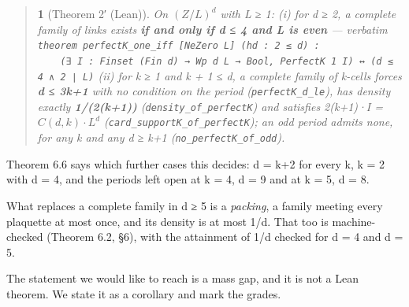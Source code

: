 \documentclass[11pt,a4paper]{article}
\theoremstyle{named}
\newtheorem*{namedthm}{}
\begin{document}
\begin{quote}
\begin{namedthm}[Theorem 2′ (Lean)]
On $(Z/L)^d$ with L ≥ 1: (i) for d ≥ 2, a complete family of links exists \textbf{if and only if d ≤ 4 and L is even} — verbatim\\
\texttt{theorem\ \allowbreak{}perfectK\_\allowbreak{}one\_\allowbreak{}iff\ \allowbreak{}[NeZero\ \allowbreak{}L]\ \allowbreak{}(hd\ \allowbreak{}:\ \allowbreak{}2\ \allowbreak{}≤\ \allowbreak{}d)\ \allowbreak{}:}\\
\texttt{\ \allowbreak{}\ \allowbreak{}\ \allowbreak{}\ \allowbreak{}(∃\ \allowbreak{}I\ \allowbreak{}:\ \allowbreak{}Finset\ \allowbreak{}(Fin\ \allowbreak{}d)\ \allowbreak{}→\ \allowbreak{}Wp\ \allowbreak{}d\ \allowbreak{}L\ \allowbreak{}→\ \allowbreak{}Bool,\ \allowbreak{}PerfectK\ \allowbreak{}1\ \allowbreak{}I)\ \allowbreak{}↔\ \allowbreak{}(d\ \allowbreak{}≤\ \allowbreak{}4\ \allowbreak{}∧\ \allowbreak{}2\ \allowbreak{}∣\ \allowbreak{}L)} (ii) for k ≥ 1 and k + 1 ≤ d, a complete family of k-cells forces \textbf{d ≤ 3k+1} with no condition on the period (\texttt{perfectK\_\allowbreak{}d\_\allowbreak{}le}), has density exactly \textbf{1/(2(k+1))} (\texttt{density\_\allowbreak{}of\_\allowbreak{}perfectK}) and satisfies 2(k+1)·\textbar{}I\textbar{} = $C(d,k)·L^d$ (\texttt{card\_\allowbreak{}supportK\_\allowbreak{}of\_\allowbreak{}perfectK}); an odd period admits none, for any k and any d ≥ k+1 (\texttt{no\_\allowbreak{}perfectK\_\allowbreak{}of\_\allowbreak{}odd}).
\end{namedthm}
\end{quote}
Theorem 6.6 says which further cases this decides: d = k+2 for every k, k = 2 with d = 4, and the periods left open at k = 4, d = 9 and at k = 5, d = 8.

What replaces a complete family in d ≥ 5 is a \textit{packing}, a family meeting every plaquette at most once, and its density is at most 1/d. That too is machine-checked (Theorem 6.2, §6), with the attainment of 1/d checked for d = 4 and d = 5.

The statement we would like to reach is a mass gap, and it is not a Lean theorem. We state it as a corollary and mark the grades.
\end{document}
